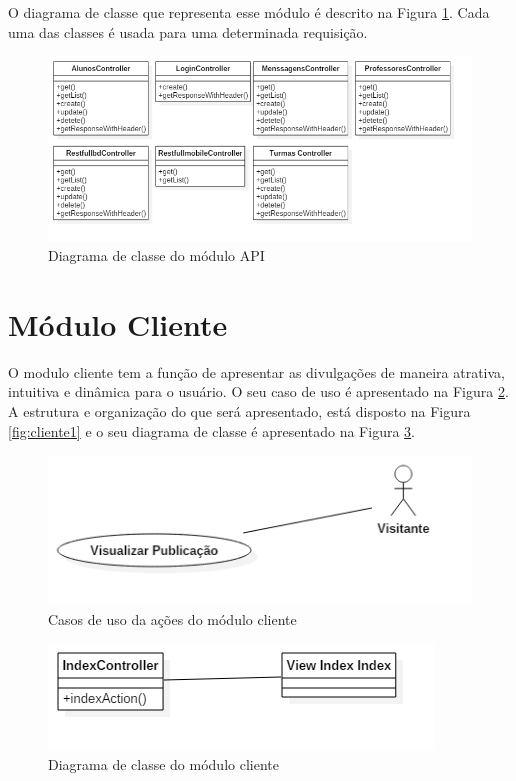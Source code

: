O diagrama de classe que representa esse módulo é descrito na Figura \ref{fig:diagramaclasseAPI}. Cada uma das classes é usada para uma determinada requisição.
\begin{figure}[H]
\centering
\includegraphics[scale=0.5]{figuras/diagramaclasseAPI}
\caption{Diagrama de classe do módulo API}
\label{fig:diagramaclasseAPI}
\end{figure}

\section{Módulo Cliente}
\label{sec:cliente}
O modulo cliente tem a função de apresentar as divulgações de maneira atrativa, intuitiva e dinâmica para o usuário. O seu caso de uso é apresentado na Figura \ref{fig:casosDeUsoCliente}. A estrutura e organização do que será apresentado, está disposto na Figura \ref{fig:cliente1} e o seu diagrama de classe é apresentado na Figura \ref{fig:diagramaclasseCLIENTE}.

\begin{figure}[H]
\centering
\includegraphics[scale=0.6]{figuras/CasosDeUsoCliente}
\caption{Casos de uso da ações do módulo cliente}
\label{fig:casosDeUsoCliente}
\end{figure} 

\begin{figure}[H]
\centering
\includegraphics[scale=0.4]{figuras/diagramaclasseCLIENTE}
\caption{Diagrama de classe do módulo cliente}
\label{fig:diagramaclasseCLIENTE}
\end{figure}

